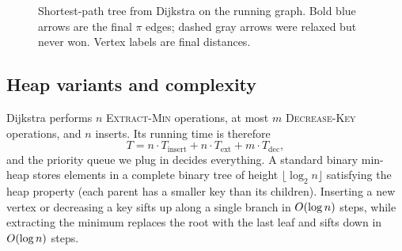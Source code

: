 \begin{figure}[H]
\centering
{}
\caption{Shortest-path tree from Dijkstra on the running graph. Bold blue arrows are the
final $\pi$ edges; dashed gray arrows were relaxed but never won. Vertex labels are final
distances.}
\label{ch07:spt-figure}
\end{figure}

\subsection{Heap variants and complexity}
\label{ch07:dijkstra-heaps}

Dijkstra performs $n$ \textsc{Extract-Min} operations, at most $m$ \textsc{Decrease-Key}
operations, and $n$ inserts. Its running time is therefore
\[
   T = n\cdot T_{\text{insert}} + n\cdot T_{\text{ext}} + m\cdot T_{\text{dec}},
\]
and the priority queue we plug in decides everything. A standard binary min-heap stores
elements in a complete binary tree of height $\lfloor \log_2 n \rfloor$ satisfying the heap property
(each parent has a smaller key than its children). Inserting a new vertex or decreasing a key sifts
up along a single branch in $O(\log n)$ steps, while extracting the minimum replaces the root with
the last leaf and sifts down in $O(\log n)$ steps.

